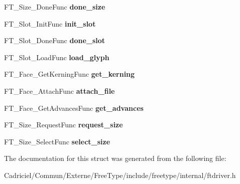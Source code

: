 \begin{DoxyCompactItemize}
\item 
F\+T\+\_\+\+Size\+\_\+\+Done\+Func {\bfseries done\+\_\+size}\hypertarget{struct_f_t___driver___class_rec___a5c96f627816a089b27bcff09f22dd1a6}{}\label{struct_f_t___driver___class_rec___a5c96f627816a089b27bcff09f22dd1a6}

\item 
F\+T\+\_\+\+Slot\+\_\+\+Init\+Func {\bfseries init\+\_\+slot}\hypertarget{struct_f_t___driver___class_rec___ae4e1d4ec7bdbdee0b4a5f8fc8f113d30}{}\label{struct_f_t___driver___class_rec___ae4e1d4ec7bdbdee0b4a5f8fc8f113d30}

\item 
F\+T\+\_\+\+Slot\+\_\+\+Done\+Func {\bfseries done\+\_\+slot}\hypertarget{struct_f_t___driver___class_rec___a548a343f5921f5d341142bf3743c42d4}{}\label{struct_f_t___driver___class_rec___a548a343f5921f5d341142bf3743c42d4}

\item 
F\+T\+\_\+\+Slot\+\_\+\+Load\+Func {\bfseries load\+\_\+glyph}\hypertarget{struct_f_t___driver___class_rec___a49dbd71e64094d4d825b8b8d51dd4e47}{}\label{struct_f_t___driver___class_rec___a49dbd71e64094d4d825b8b8d51dd4e47}

\item 
F\+T\+\_\+\+Face\+\_\+\+Get\+Kerning\+Func {\bfseries get\+\_\+kerning}\hypertarget{struct_f_t___driver___class_rec___a398395bfdbef65a8d531724d200ed91c}{}\label{struct_f_t___driver___class_rec___a398395bfdbef65a8d531724d200ed91c}

\item 
F\+T\+\_\+\+Face\+\_\+\+Attach\+Func {\bfseries attach\+\_\+file}\hypertarget{struct_f_t___driver___class_rec___a9caec9ae56a4bab9c90cede699279f29}{}\label{struct_f_t___driver___class_rec___a9caec9ae56a4bab9c90cede699279f29}

\item 
F\+T\+\_\+\+Face\+\_\+\+Get\+Advances\+Func {\bfseries get\+\_\+advances}\hypertarget{struct_f_t___driver___class_rec___aad560cd145b6d7cab7eae79194b1d724}{}\label{struct_f_t___driver___class_rec___aad560cd145b6d7cab7eae79194b1d724}

\item 
F\+T\+\_\+\+Size\+\_\+\+Request\+Func {\bfseries request\+\_\+size}\hypertarget{struct_f_t___driver___class_rec___a03ff7c2e4a2fb6d08eb481b03a78e8de}{}\label{struct_f_t___driver___class_rec___a03ff7c2e4a2fb6d08eb481b03a78e8de}

\item 
F\+T\+\_\+\+Size\+\_\+\+Select\+Func {\bfseries select\+\_\+size}\hypertarget{struct_f_t___driver___class_rec___a1b365eb82525dae0a816974d949fe0dd}{}\label{struct_f_t___driver___class_rec___a1b365eb82525dae0a816974d949fe0dd}

\end{DoxyCompactItemize}


The documentation for this struct was generated from the following file\+:\begin{DoxyCompactItemize}
\item 
Cadriciel/\+Commun/\+Externe/\+Free\+Type/include/freetype/internal/ftdriver.\+h\end{DoxyCompactItemize}
